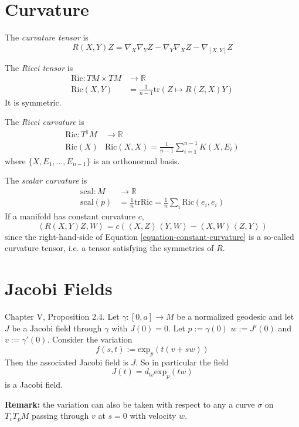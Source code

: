 \section{Curvature}
\label{section-curvature}

The {\it curvature tensor} is
\begin{equation}
\label{equation-curvature-tensor}
R(X,Y)Z=\nabla_X\nabla_YZ-\nabla_Y\nabla_XZ-\nabla_{[X,Y]}Z
\end{equation}

The {\it Ricci tensor} is
\begin{align*}
	\text{Ric}: TM\times TM &\longrightarrow \mathbb{R} \\
	 \text{Ric}(X,Y)&=\frac{1}{n-1}\text{tr}(Z\mapsto R(Z,X)Y)
\end{align*}
It is symmetric.

The {\it Ricci curvature} is
\begin{align*}
	\text{Ric}: T^1M &\longrightarrow \mathbb{R} \\
	\text{Ric}(X)&\text{Ric}(X,X)=\frac{1}{n-1}\sum_{i=1}^{n-1}K(X,E_i)
\end{align*}
where $\{X,E_1,\ldots,E_{n-1}\}$ is an orthonormal basis.

The {\it scalar curvature} is
\begin{align*}
	\text{scal}: M &\longrightarrow \mathbb{R} \\
	\text{scal}(p)&=\frac{1}{n}\text{tr}\text{Ric}
=\frac{1}{n}\sum_i\text{Ric}(e_i,e_i)
\end{align*}
If a manifold has constant curvature $c$,
\begin{equation}
\label{equation-constant-curvature}
\left<R(X,Y)Z,W\right>=
c(\left<X,Z\right>\left<Y,W\right>-\left<X,W\right>\left<Z,Y\right>)
\end{equation}
since the right-hand-side of Equation \ref{equation-constant-curvature} is a
so-called curvature tensor, i.e. a tensor satisfying the symmetries of $R$.

\section{Jacobi Fields}
\label{section-jacobi-fields}

\begin{proposition}
\label{proposition-everyday-jacobi-field}
\cite{doc} Chapter V, Proposition 2.4. Let $\gamma:[0,a]\to M$ be a normalized
geodesic and let $J$ be a Jacobi field through $\gamma$ with $J(0)=0$.
Let $p:=\gamma(0)$ $w:=J'(0)$ and  $v:=\gamma'(0)$. 
Consider the variation
$$
f(s,t):=\text{exp}_{p}(t(v+sw))
$$
Then the associated Jacobi field is $J$. So in particular the field
$$
J(t)=d_{tv}\text{exp}_p(tw)
$$
is a Jacobi field.

{\bf Remark:} the variation can also be taken with respect to
any a curve $\sigma$ on $T_vT_{p}M$ passing through $v$ 
at $s=0$ with velocity $w$.
\end{proposition}


